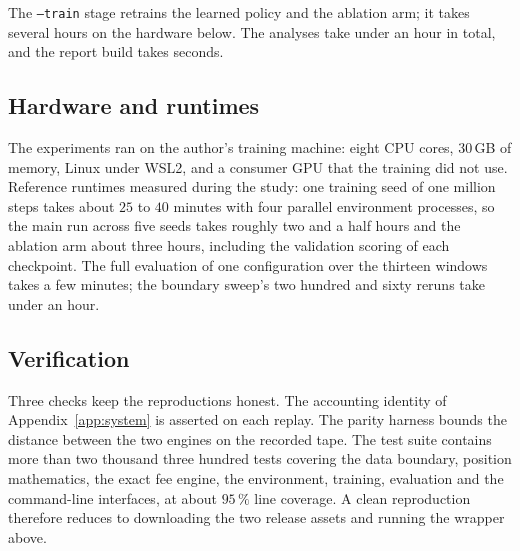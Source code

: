 The \texttt{--train} stage retrains the learned policy and the ablation arm;
it takes several hours on the hardware below. The analyses take under an hour
in total, and the report build takes seconds.

\subsection{Hardware and runtimes}

The experiments ran on the author's training machine: eight CPU cores,
$30$\,GB of memory, Linux under WSL2, and a consumer GPU that the training did
not use. Reference runtimes measured during the study: one training seed of
one million steps takes about $25$ to $40$ minutes with four parallel
environment processes, so the main run across five seeds takes roughly two and a half
hours and the ablation arm about three hours, including the validation scoring
of each checkpoint. The full evaluation of one configuration over the thirteen
windows takes a few minutes; the boundary sweep's two hundred and sixty
reruns take under an hour.

\subsection{Verification}

Three checks keep the reproductions honest. The accounting identity of
Appendix~\ref{app:system} is asserted on each replay. The parity harness
bounds the distance between the two engines on the recorded tape. The test
suite contains more than two thousand three hundred tests covering the data
boundary, position mathematics, the exact fee engine, the environment,
training, evaluation and the command-line interfaces, at about $95\,\%$ line
coverage. A clean reproduction therefore reduces to downloading the two
release assets and running the wrapper above.

